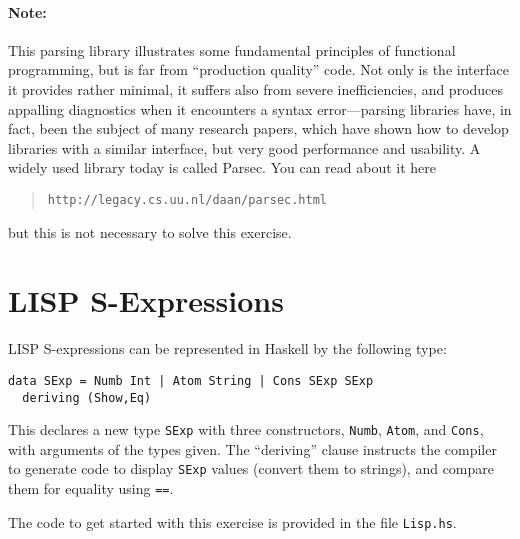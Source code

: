 \documentclass{article}
\begin{document}
\paragraph{Note:} This parsing library illustrates some fundamental
principles of functional programming, but is far from ``production
quality'' code. Not only is the interface it provides rather minimal,
it suffers also from severe inefficiencies, and produces appalling
diagnostics when it encounters a syntax error---parsing libraries
have, in fact, been the subject of many research papers, which have
shown how to develop libraries with a similar interface, but very good
performance and usability. A widely used library today is
called Parsec. You can read about it here
\begin{quote}
\texttt{http://legacy.cs.uu.nl/daan/parsec.html}
\end{quote}
but this is not necessary to solve this exercise.


\section{LISP S-Expressions}
LISP S-expressions can be represented in Haskell by the following
type:
\begin{verbatim}
data SExp = Numb Int | Atom String | Cons SExp SExp
  deriving (Show,Eq)
\end{verbatim}
This declares a new type \texttt{SExp} with three constructors,
\texttt{Numb}, \verb!Atom!, and \verb!Cons!, with arguments of the types
given. The ``deriving'' clause instructs the compiler to generate code
to display \verb!SExp! values (convert them to strings), and compare
them for equality using \verb!==!.

The code to get started with this exercise is provided in the file \texttt{Lisp.hs}.
\end{document}
